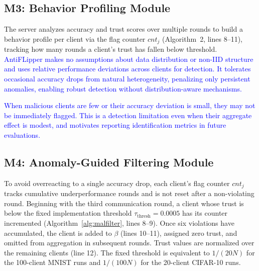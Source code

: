 \documentclass[conference]{IEEEtran}
\begin{document}
\subsection{M3: Behavior Profiling Module}
The server analyzes accuracy and trust scores over multiple rounds to build a behavior profile per client via the flag counter $cnt_j$ (Algorithm~2, lines 8--11), tracking how many rounds a client's trust has fallen below threshold. \textcolor{blue}{AntiFLipper makes no assumptions about data distribution or non-IID structure and uses relative performance deviations across clients for detection. It tolerates occasional accuracy drops from natural heterogeneity, penalizing only persistent anomalies, enabling robust detection without distribution-aware mechanisms.}

\textcolor{blue}{When malicious clients are few or their accuracy deviation is small, they may not be immediately flagged. This is a detection limitation even when their aggregate effect is modest, and motivates reporting identification metrics in future evaluations.}

\subsection{M4: Anomaly-Guided Filtering Module}
To avoid overreacting to a single accuracy drop, each client's flag counter $cnt_j$ tracks cumulative underperformance rounds and is not reset after a non-violating round. Beginning with the third communication round, a client whose trust is below the fixed implementation threshold $\tau_{\text{thresh}}=0.0005$ has its counter incremented (Algorithm~\ref{alg:malfilter}, lines 8--9). Once six violations have accumulated, the client is added to $\beta$ (lines 10--11), assigned zero trust, and omitted from aggregation in subsequent rounds. Trust values are normalized over the remaining clients (line 12). The fixed threshold is equivalent to $1/(20N)$ for the 100-client MNIST runs and $1/(100N)$ for the 20-client CIFAR-10 runs.
\end{document}

